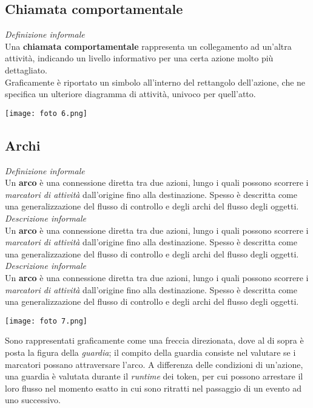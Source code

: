 \documentclass{article}
\begin{document}
\subsection*{Chiamata comportamentale}
\large
\textit{Definizione informale}\\Una \textbf{chiamata comportamentale} rappresenta un collegamento ad un'altra attività, indicando un livello informativo per una certa azione molto più dettagliato.\vspace*{14pt}\\
Graficamente è riportato un simbolo all'interno del rettangolo dell'azione, che ne specifica un ulteriore diagramma di attività, univoco per quell'atto.\\
\begin{center}
    \texttt{[image: foto 6.png]}
\end{center}

\subsection*{Archi}
\large
\textit{Definizione informale}\\Un \textbf{arco} è una connessione diretta tra due azioni, lungo i quali possono scorrere i \textit{marcatori di attività} dall'origine fino alla destinazione. Spesso è descritta come una generalizzazione del flusso di controllo e degli archi del flusso degli oggetti.\\
\textit{Descrizione informale}\\Un \textbf{arco} è una connessione diretta tra due azioni, lungo i quali possono scorrere i \textit{marcatori di attività} dall'origine fino alla destinazione. Spesso è descritta come una generalizzazione del flusso di controllo e degli archi del flusso degli oggetti.\\
\textit{Descrizione informale}\\Un \textbf{arco} è una connessione diretta tra due azioni, lungo i quali possono scorrere i \textit{marcatori di attività} dall'origine fino alla destinazione. Spesso è descritta come una generalizzazione del flusso di controllo e degli archi del flusso degli oggetti.\\
\begin{center}
    \texttt{[image: foto 7.png]}
\end{center}
Sono rappresentati graficamente come una freccia direzionata, dove al di sopra è posta la figura della \textit{guardia}; il compito della guardia consiste nel valutare se i marcatori possano attraversare l'arco. A differenza delle condizioni di un'azione, una guardia è valutata durante il \textit{runtime} dei token, per cui possono arrestare il loro flusso nel momento esatto in cui sono ritratti nel passaggio di un evento ad uno successivo.
\end{document}

